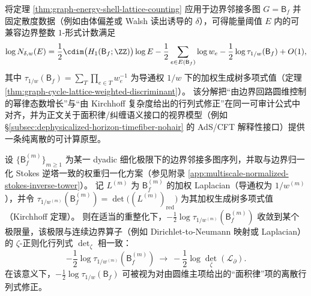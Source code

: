 \begin{remark}[离散面积律的圆维主项与生成树行列式校正]\label{rem:hypercube-boundary-cycle-entropy-area-law-tree-correction}
将定理 \ref{thm:graph-energy-shell-lattice-counting} 应用于边界邻接多图 \(G=\mathsf B_f\) 并固定散度数据（例如由体偏差或 Walsh 读出诱导的 \(\delta\)），可得能量阈值 \(E\) 内的可兼容边界整数 \(1\)-形式计数满足
\[
\log N_{\delta,w}(E)
=\frac{1}{2}\cdim\bigl(H_1(\mathsf B_f;\ZZ)\bigr)\log E
-\frac12\sum_{e\in E(\mathsf B_f)}\log w_e
-\frac12\log\tau_{1/w}(\mathsf B_f)
 +O(1),
\]
其中 \(\tau_{1/w}(\mathsf B_f)=\sum_{T}\prod_{e\in T}w_e^{-1}\) 为导通权 \(1/w\) 下的加权生成树多项式值（定理 \ref{thm:graph-cycle-lattice-weighted-discriminant}）。
该分解把“由边界回路圆维控制的幂律态数增长”与“由 Kirchhoff 复杂度给出的行列式修正”在同一可审计公式中对齐，并为正文关于面积律/纠缠语义接口的视界模型（例如 \S\ref{subsec:dephysicalized-horizon-timefiber-nohair} 的 AdS/CFT 解释性接口）提供一条纯离散的可计算原型。
\end{remark}

\begin{conjecture}[生成树行列式的连续谱极限接口]\label{conj:boundary-tree-determinant-spectral-limit}
设 \(\{\mathsf B^{(m)}_f\}_{m\ge 1}\) 为某一 dyadic 细化极限下的边界邻接多图序列，并取与边界归一化 Stokes 逆塔一致的权重归一化方案（参见附录 \ref{app:multiscale-normalized-stokes-inverse-tower}）。
记 \(L^{(m)}\) 为 \(\mathsf B^{(m)}_f\) 的加权 Laplacian（导通权为 \(1/w^{(m)}\)），并令 \(\tau_{1/w^{(m)}}(\mathsf B^{(m)}_f)=\det\bigl((L^{(m)})_{\mathrm{red}}\bigr)\) 为其加权生成树多项式值（Kirchhoff 定理）。
则在适当的重整化下，\(-\tfrac12\log\tau_{1/w^{(m)}}(\mathsf B^{(m)}_f)\) 收敛到某个极限量，该极限与连续边界算子（例如 Dirichlet-to-Neumann 映射或 Laplacian）的 \(\zeta\)-正则化行列式 \(\det_\zeta\) 相一致：
\[
-\frac12\log\tau_{1/w^{(m)}}(\mathsf B^{(m)}_f)\ \longrightarrow\ -\frac12\log\det_\zeta(\mathcal L_{\partial}).
\]
在该意义下，\(-\tfrac12\log\tau_{1/w}(\mathsf B_f)\) 可被视为对由圆维主项给出的“面积律”项的离散行列式修正。
\end{conjecture}

